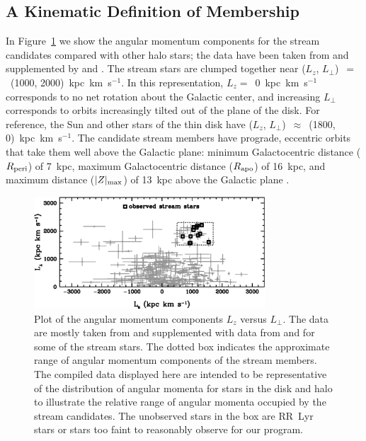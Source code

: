 \documentclass{emulateapj}
\begin{document}
\subsection{A Kinematic Definition of Membership}


In Figure~\ref{angmomplot} we show the angular momentum components
for the stream candidates compared with other halo stars;
the data have been taken from \citet{morrison09} and supplemented
by \citet{chiba00} and \citet{refiorentin05}.
The stream stars are clumped together near 
($L_{z}$, $L_{\perp}$)~$=$~(1000, 2000)~kpc~km~s$^{-1}$.
In this representation, $L_{z} =$~0~kpc~km~s$^{-1}$ corresponds to
no net rotation about the Galactic center, and increasing $L_{\perp}$
corresponds to orbits increasingly tilted out of the plane of the disk.
For reference, the Sun and other stars of the thin disk have 
($L_{z}$, $L_{\perp}$)~$\approx$~(1800, 0)~kpc~km~s$^{-1}$.
The candidate stream members have prograde, eccentric orbits that take
them well above the Galactic plane:
minimum Galactocentric distance ($R_{\rm peri}$) of 7~kpc, 
maximum Galactocentric distance ($R_{\rm apo}$) of 16~kpc, 
and maximum distance ($|Z|_{\rm max}$) of 13~kpc above the Galactic plane
\citep{helmi99b}.

\begin{figure}
\includegraphics[angle=0,width=3.4in]{fig01.eps}
\caption{
\label{angmomplot}
Plot of the angular momentum components $L_{z}$ versus $L_{\perp}$.
The data are mostly taken from \citet{morrison09} and supplemented
with data from \citet{chiba00} and \citet{refiorentin05} for some
of the stream stars.
The dotted box indicates the approximate range of angular momentum 
components of the stream members.
The compiled data displayed here are intended to be representative
of the distribution of angular momenta for stars in the disk and halo
to illustrate the relative range of angular momenta occupied by
the stream candidates. 
The unobserved stars in the box are RR~Lyr stars or stars too
faint to reasonably observe for our program.
}
\end{figure}
\end{document}
